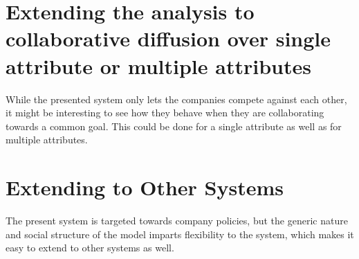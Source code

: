 \section{Extending the analysis to collaborative diffusion over single attribute or multiple attributes}

While the presented system only lets the companies compete against each other, it might be interesting to see how they behave when they are collaborating towards a common goal. This could be done for a single attribute as well as for multiple attributes. 

\section{Extending to Other Systems}

The present system is targeted towards company policies, but the generic nature and social structure of the model imparts flexibility to the system, which makes it easy to extend to other systems as well.